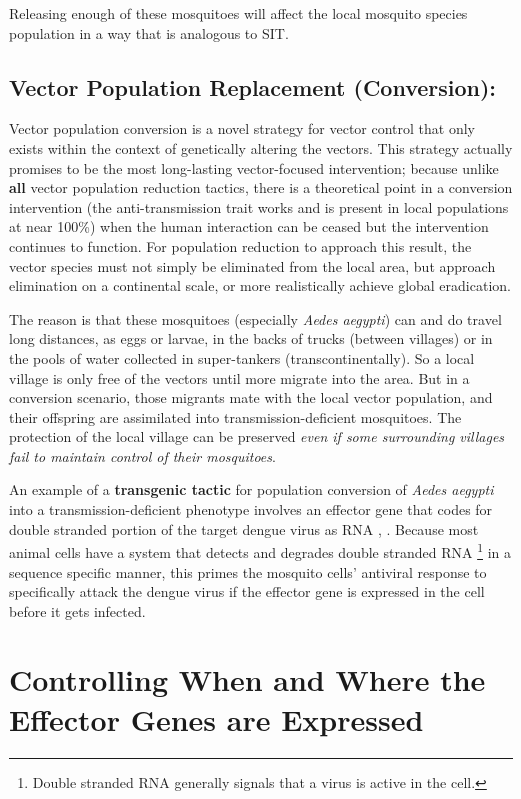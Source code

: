 Releasing enough of these mosquitoes will affect the local mosquito species population in a way that is analogous to \gls{SIT}.

\subsection{Vector Population Replacement (Conversion):}

Vector population conversion is a novel strategy for vector control that only exists within the context of genetically altering the vectors.
This strategy actually promises to be the most long-lasting vector-focused intervention; because unlike \textbf{all} vector population reduction tactics, there is a theoretical point in a conversion intervention (the anti-transmission trait works and is present in local populations at near 100\%) when the human interaction can be ceased but the intervention continues to function.
For population reduction to approach this result, the vector species must not simply be eliminated from the local area, but approach elimination on a continental scale, or more realistically achieve global eradication.

The reason is that these mosquitoes (especially \emph{Aedes aegypti}) can and do travel long distances, as eggs or larvae, in the backs of trucks (between villages) or in the pools of water collected in super-tankers (transcontinentally).
So a local village is only free of the vectors until more migrate into the area.
But in a conversion scenario, those migrants mate with the local vector population, and their offspring are assimilated into transmission-deficient mosquitoes.
The protection of the local village can be preserved \emph{even if some surrounding villages fail to maintain control of their mosquitoes}.

An example of a \textbf{transgenic tactic} for population conversion of \emph{Aedes aegypti} into a transmission-deficient phenotype involves an effector gene that codes for double stranded portion of the target dengue virus as RNA \cite{Franz2006}, \cite{Mathur2010}.
Because most animal cells have a system that detects and degrades double stranded RNA
\footnote{Double stranded RNA generally signals that a virus is active in the cell.}
in a sequence specific manner, this primes the mosquito cells' antiviral response to specifically attack the dengue virus if the effector gene is expressed in the cell before it gets infected.

\section{Controlling When and Where the Effector Genes are Expressed}

